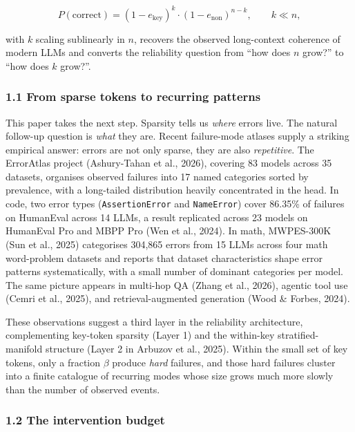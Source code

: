 \documentclass[
]{article}
\begin{document}
\[
P(\text{correct}) = (1-e_{\text{key}})^{k} \cdot (1-e_{\text{non}})^{n-k}, \qquad k \ll n,
\]

with \(k\) scaling sublinearly in \(n\), recovers the observed
long-context coherence of modern LLMs and converts the reliability
question from ``how does \(n\) grow?'' to ``how does \(k\) grow?''.

\subsubsection{1.1 From sparse tokens to recurring
patterns}\label{from-sparse-tokens-to-recurring-patterns}

This paper takes the next step. Sparsity tells us \emph{where} errors
live. The natural follow-up question is \emph{what} they are. Recent
failure-mode atlases supply a striking empirical answer: errors are not
only sparse, they are also \emph{repetitive}. The ErrorAtlas project
(Ashury-Tahan et al., 2026), covering 83 models across 35 datasets,
organises observed failures into 17 named categories sorted by
prevalence, with a long-tailed distribution heavily concentrated in the
head. In code, two error types (\texttt{AssertionError} and
\texttt{NameError}) cover 86.35\% of failures on HumanEval across 14
LLMs, a result replicated across 23 models on HumanEval Pro and MBPP Pro
(Wen et al., 2024). In math, MWPES-300K (Sun et al., 2025) categorises
304,865 errors from 15 LLMs across four math word-problem datasets and
reports that dataset characteristics shape error patterns
systematically, with a small number of dominant categories per model.
The same picture appears in multi-hop QA (Zhang et al., 2026), agentic
tool use (Cemri et al., 2025), and retrieval-augmented generation (Wood
\& Forbes, 2024).

These observations suggest a third layer in the reliability
architecture, complementing key-token sparsity (Layer 1) and the
within-key stratified-manifold structure (Layer 2 in Arbuzov et al.,
2025). Within the small set of key tokens, only a fraction \(\beta\)
produce \emph{hard} failures, and those hard failures cluster into a
finite catalogue of recurring modes whose size grows much more slowly
than the number of observed events.

\subsubsection{1.2 The intervention
budget}\label{the-intervention-budget}
\end{document}
